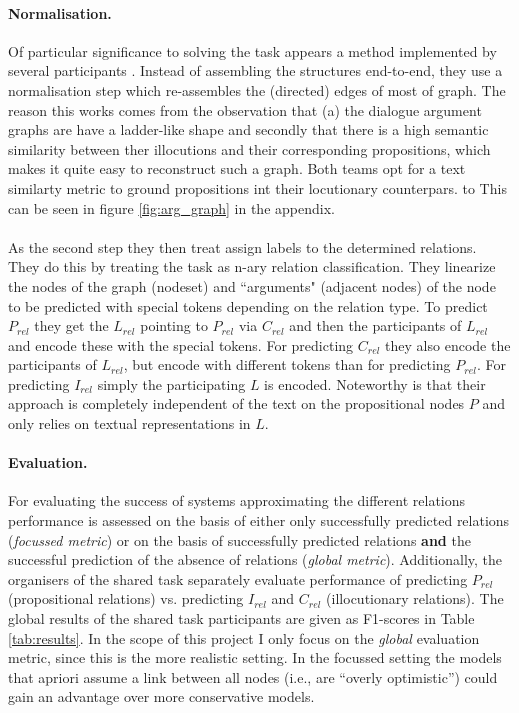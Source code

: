 \documentclass[11pt]{article}
\begin{document}
\paragraph{Normalisation.} Of particular significance to solving the task appears a method implemented by several participants \citep{binder_dfki-mlst_2024,chaixanien_pungene_2024}. Instead of assembling the structures end-to-end, they use a normalisation step which re-assembles the (directed) edges of most of graph. The reason this works comes from the observation that (a) the dialogue argument graphs are have a ladder-like shape and secondly that there is a high semantic similarity between ther illocutions and their corresponding propositions, which makes it quite easy to reconstruct such a graph. Both teams opt for a text similarty metric to ground propositions int their locutionary counterpars. to This can be seen in figure \ref{fig:arg_graph} in the appendix. \\
\\
As the second step they then treat assign labels to the determined relations. They do this by treating the task as n-ary relation classification. They linearize the nodes of the graph (nodeset) and ``arguments" (adjacent nodes) of the node to be predicted with special tokens depending on the relation type. To predict $P_{rel}$ they get the $L_{rel}$ pointing to $P_{rel}$ via $C_{rel}$  and then the participants of $L_{rel}$ and encode these with the special tokens. For predicting $C_{rel}$ they also encode the participants of $L_{rel}$, but encode with different tokens than for predicting $P_{rel}$. For predicting $I_{rel}$ simply the participating $L$ is encoded. Noteworthy is that their approach is completely independent of the text on the propositional nodes $P$ and only relies on textual representations in $L$.

\paragraph{Evaluation.} For evaluating the success of systems approximating the different relations performance is assessed on the basis of either only successfully predicted relations (\textit{focussed metric}) or on the basis of successfully predicted relations \textbf{and} the successful prediction of the absence of relations (\textit{global metric}). Additionally, the organisers of the shared task separately evaluate performance of predicting $P_{rel}$ (propositional relations) vs. predicting $I_{rel}$ and  $C_{rel}$ (illocutionary relations). The global results of the shared task participants are given as F1-scores in Table \ref{tab:results}. In the scope of this project I only focus on the \textit{global} evaluation metric, since this is the more realistic setting. In the focussed setting the models that apriori assume a link between all nodes (i.e., are ``overly optimistic'') could gain an advantage over more conservative models. \\
\end{document}
